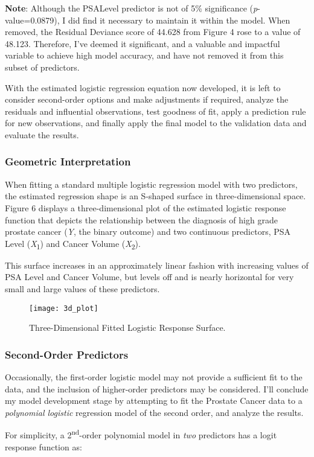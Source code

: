 \textbf{Note}: Although the PSALevel predictor is not of 5\% significance (\textit{p}-value=0.0879), I did find it necessary to maintain it within the model. When removed, the Residual Deviance score of 44.628 from Figure 4 rose to a value of 48.123. Therefore, I've deemed it significant, and a valuable and impactful variable to achieve high model accuracy, and have not removed it from this subset of predictors. \par
With the estimated logistic regression equation now developed, it is left to consider second-order options and make adjustments if required, analyze the residuals and influential observations, test goodness of fit, apply a prediction rule for new observations, and finally apply the final model to the validation data and evaluate the results.

\subsubsection{Geometric Interpretation}
When fitting a standard multiple logistic regression model with two predictors, the estimated regression shape is an S-shaped surface in three-dimensional space. Figure 6 displays a three-dimensional plot of the estimated logistic response function that depicts the relationship between the diagnosis of high grade prostate cancer (\textit{Y}, the binary outcome) and two continuous predictors, PSA Level (\textit{X}\textsubscript{1}) and Cancer Volume (\textit{X}\textsubscript{2}). \par
This surface increases in an approximately linear fashion with increasing values of PSA Level and Cancer Volume, but levels off and is nearly horizontal for very small and large values of these predictors.

\begin{figure}[H]
	\centering
	\texttt{[image: 3d\_plot]}
	\caption{Three-Dimensional Fitted Logistic Response Surface.}
\end{figure}

\subsubsection{Second-Order Predictors}
Occasionally, the first-order logistic model may not provide a sufficient fit to the data, and the inclusion of higher-order predictors may be considered. I'll conclude my model development stage by attempting to fit the Prostate Cancer data to a \textit{polynomial logistic} regression model of the second order, and analyze the results. \par 
For simplicity, a 2\textsuperscript{nd}-order polynomial model in \textit{two} predictors has a logit response function as:

